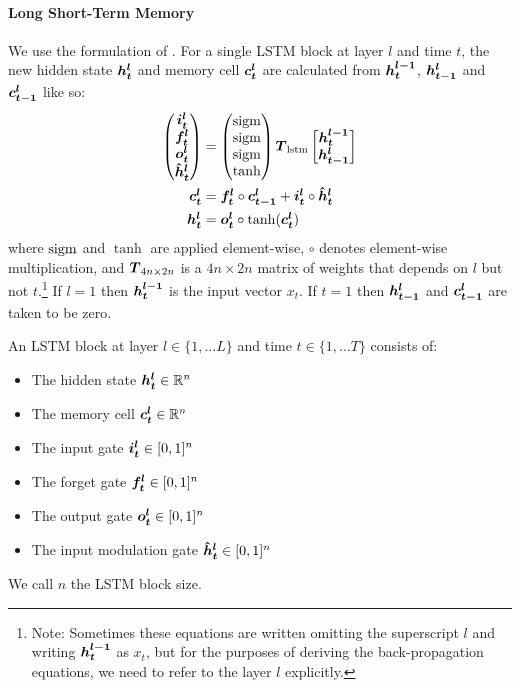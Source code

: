 \paragraph{Long Short-Term Memory}
We use the formulation of \cite{zaremba14}.
For a single LSTM block at layer $l$ and time $t$, the new hidden state $\mbox{\boldmath{$h^l_t$}}$ and memory cell $\mbox{\boldmath{$c^l_t$}}$ are calculated from $\mbox{\boldmath{$h_t^{l-1}$}}$, $\mbox{\boldmath{$h_{t-1}^l$}}$ and $\mbox{\boldmath{$c_{t-1}^l$}}$ like so:
\begin{align}
\label{eqn:LSTMdef1}
\begin{pmatrix}
\mbox{\boldmath{$i^l_t$}} \\
\mbox{\boldmath{$f^l_t$}} \\
\mbox{\boldmath{$o^l_t$}} \\
\mbox{\boldmath{$\hat{h}^l_t$}}
\end{pmatrix}
&= 
\begin{pmatrix}
\operatorname{sigm} \\
\operatorname{sigm} \\
\operatorname{sigm} \\
\tanh
\end{pmatrix}
\mbox{\boldmath{$T$}}_{\text{lstm}}
\begin{bmatrix}
  \mbox{\boldmath{$h_t^{l-1}$}} \\
  \mbox{\boldmath{$h_{t-1}^l$}}
 \end{bmatrix} \\
\mbox{\boldmath{$c^l_t$}} &= \mbox{\boldmath{$f^l_t$}} \circ \mbox{\boldmath{$c_{t-1}^l$}} + \mbox{\boldmath{$i^l_t$}} \circ \mbox{\boldmath{$\hat{h}^l_t$}} \\
\mbox{\boldmath{$h^l_t$}} &= \mbox{\boldmath{$o^l_t$}} \circ \tanh(\mbox{\boldmath{$c^l_t$}})
\end{align}
where $\operatorname{sigm}$ and $\tanh$ are applied element-wise, $\circ$ denotes element-wise multiplication, 
and $\mbox{\boldmath{$T$}}_{4n \times 2n}$ is a $4n \times 2n$ matrix of weights that depends on $l$ but not $t$.\footnote{Note: Sometimes these equations are written omitting the superscript $l$ and writing $\mbox{\boldmath{$h_t^{l-1}$}}$ as $x_t$, but for the purposes of deriving the back-propagation equations, we need to refer to the layer $l$ explicitly.}
If $l=1$ then $\mbox{\boldmath{$h_t^{l-1}$}}$ is the input vector $x_t$.
If $t=1$ then $\mbox{\boldmath{$h_{t-1}^l$}}$ and $\mbox{\boldmath{$c_{t-1}^l$}}$ are taken to be zero.

An LSTM block at layer $l \in \{1, \dots L\}$ and time $t \in \{1, \dots T\}$ consists of:
\begin{itemize}
\item The hidden state $\mbox{\boldmath{$h^l_t$}} \in \mathbb{R}^n$
\item The memory cell $\mbox{\boldmath{$c^l_t$}} \in \mathbb{R}^n$
\item The input gate $\mbox{\boldmath{$i^l_t$}} \in [0,1]^n$
\item The forget gate $\mbox{\boldmath{$f^l_t$}} \in [0,1]^n$
\item The output gate $\mbox{\boldmath{$o^l_t$}} \in [0,1]^n$
\item The input modulation gate $\mbox{\boldmath{$\hat{h}^l_t$}} \in [0,1]^n$
\end{itemize}
We call $n$ the LSTM block size.

